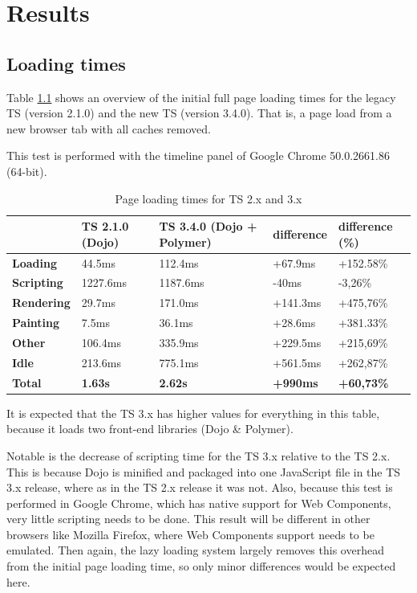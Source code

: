 \chapter{Results}


\section{Loading times}
\label{Loading times}
Table \ref{tbl:loadingtimes} shows an overview of the initial full page loading
times for the legacy TS (version 2.1.0) and the new TS (version 3.4.0). That is,
a page load from a new browser tab with all caches removed.

This test is performed with the timeline panel of Google Chrome 50.0.2661.86 (64-bit).

\begin{table}
  \begin{center}
    \begin{tabular}{| l | l | l | l | l |}
    \hline
     & TS 2.1.0 (Dojo) & TS 3.4.0 (Dojo + Polymer) & difference & difference (\%) \\ \hline
    \textbf{Loading} & 44.5ms & 112.4ms & +67.9ms & +152.58\%  \\ \hline
    \textbf{Scripting} & 1227.6ms & 1187.6ms & -40ms & -3,26\% \\ \hline
    \textbf{Rendering} & 29.7ms & 171.0ms & +141.3ms & +475,76\% \\ \hline
    \textbf{Painting} & 7.5ms & 36.1ms & +28.6ms & +381.33\% \\ \hline
    \textbf{Other} & 106.4ms & 335.9ms & +229.5ms & +215,69\% \\ \hline
    \textbf{Idle} & 213.6ms & 775.1ms & +561.5ms & +262,87\% \\ \hline \hline
    \textbf{Total} & \textbf{1.63s} & \textbf{2.62s} & \textbf{+990ms} & \textbf{+60,73\%} \\ \hline
    \end{tabular}
  \end{center}
  \caption{Page loading times for TS 2.x and 3.x}
  \label{tbl:loadingtimes}
\end{table}

It is expected that the TS 3.x has higher values for everything in this table,
because it loads two front-end libraries (Dojo \& Polymer).

Notable is the decrease of scripting time for the TS 3.x relative to the
TS 2.x. This is because Dojo is minified and packaged into one JavaScript file
in the TS 3.x release, where as in the TS 2.x release it was not.
Also, because this test is performed in Google Chrome, which has native support
for Web Components, very little scripting needs to be done.
This result will be different in other browsers like Mozilla Firefox, where
Web Components support needs to be emulated. Then again, the lazy loading system
largely removes this overhead from the initial page loading time, so only minor
differences would be expected here.


